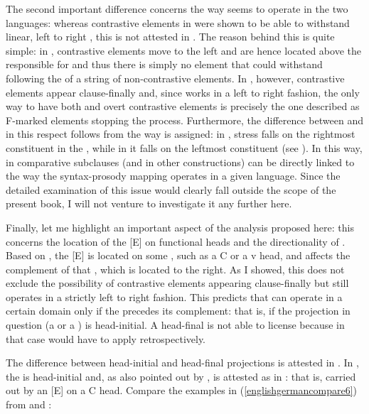 The second important difference concerns the way  seems to operate in the two languages: whereas contrastive elements in  were shown to be able to withstand linear, left to right , this is not attested in . The reason behind this is quite simple: in , contrastive elements move to the left and are hence located above the  responsible for  and thus there is simply no element that could withstand  following the  of a string of non-contrastive elements. In , however, contrastive elements appear clause-finally and, since  works in a left to right fashion, the only way to have both  and overt contrastive elements is precisely the one described as F-marked elements stopping the  process. Furthermore, the difference between  and  in this respect follows from the way  is assigned: in , stress falls on the rightmost constituent in the , while in  it falls on the leftmost constituent (see \citealt{szendroi2001diss}). In this way,  in comparative subclauses (and in other constructions) can be directly linked to the way the syntax-prosody mapping operates in a given language. Since the detailed examination of this issue would clearly fall outside the scope of the present book, I will not venture to investigate it any further here.

Finally, let me highlight an important aspect of the analysis proposed here: this concerns the location of the [E]  on functional heads and the directionality of . Based on \citet{merchant2001}, the [E]  is located on some , such as a C or a v head, and  affects the complement of that , which is located to the right. As I showed, this does not exclude the possibility of contrastive elements appearing clause-finally but  still operates in a strictly left to right fashion. This predicts that  can operate in a certain domain only if the  precedes its complement: that is, if the projection in question (a  or a ) is head-initial. A head-final  is not able to license  because in that case  would have to apply retrospectively.

The difference between head-initial and head-final projections is attested in . In , the  is head-initial and, as also pointed out by \citet{merchant2004, merchant2013},  is attested as in : that is, carried out by an [E]  on a C head. Compare the examples in (\ref{englishgermancompare6}) from  and :

